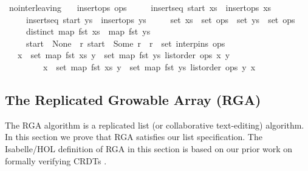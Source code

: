 \begin{isabelle}
\isamarkupfalse%
\ no{\isacharunderscore}interleaving{\isacharcolon}\isanewline
\ \ \ {\isachardoublequoteopen}insert{\isacharunderscore}ops\ ops{\isachardoublequoteclose}\isanewline
\ \ \ \ \ {\isachardoublequoteopen}insert{\isacharunderscore}seq\ start\ xs{\isachardoublequoteclose}\ \ {\isachardoublequoteopen}insert{\isacharunderscore}ops\ xs{\isachardoublequoteclose}\isanewline
\ \ \ \ \ {\isachardoublequoteopen}insert{\isacharunderscore}seq\ start\ ys{\isachardoublequoteclose}\ \ {\isachardoublequoteopen}insert{\isacharunderscore}ops\ ys{\isachardoublequoteclose}\isanewline
\ \ \ \ \ {\isachardoublequoteopen}set\ xs\ {\isasymsubseteq}\ set\ ops{\isachardoublequoteclose}\ \ {\isachardoublequoteopen}set\ ys\ {\isasymsubseteq}\ set\ ops{\isachardoublequoteclose}\isanewline
\ \ \ \ \ {\isachardoublequoteopen}distinct\ {\isacharparenleft}map\ fst\ xs\ {\isacharat}\ map\ fst\ ys{\isacharparenright}{\isachardoublequoteclose}\isanewline
\ \ \ \ \ {\isachardoublequoteopen}start\ {\isacharequal}\ None\ {\isasymor}\ {\isacharparenleft}{\isasymexists}r{\isachardot}\ start\ {\isacharequal}\ Some\ r\ {\isasymand}\ r\ {\isasymin}\ set\ {\isacharparenleft}interp{\isacharunderscore}ins\ ops{\isacharparenright}{\isacharparenright}{\isachardoublequoteclose}\isanewline
\ \ \ {\isachardoublequoteopen}{\isacharparenleft}{\isasymforall}x\ {\isasymin}\ set\ {\isacharparenleft}map\ fst\ xs{\isacharparenright}{\isachardot}\ {\isasymforall}y\ {\isasymin}\ set\ {\isacharparenleft}map\ fst\ ys{\isacharparenright}{\isachardot}\ list{\isacharunderscore}order\ ops\ x\ y{\isacharparenright}\ {\isasymor}\isanewline
\ \ \ \ \ \ \ \ \ {\isacharparenleft}{\isasymforall}x\ {\isasymin}\ set\ {\isacharparenleft}map\ fst\ xs{\isacharparenright}{\isachardot}\ {\isasymforall}y\ {\isasymin}\ set\ {\isacharparenleft}map\ fst\ ys{\isacharparenright}{\isachardot}\ list{\isacharunderscore}order\ ops\ y\ x{\isacharparenright}{\isachardoublequoteclose}
\end{isabelle}


\subsection{The Replicated Growable Array (RGA)}

The RGA algorithm \cite{Roh:2011dw} is a replicated list (or collaborative text-editing) algorithm.
In this section we prove that RGA satisfies our list specification.
The Isabelle/HOL definition of RGA in this section is based on our prior work on formally verifying CRDTs \cite{Gomes:2017gy,Gomes:2017vo}.

